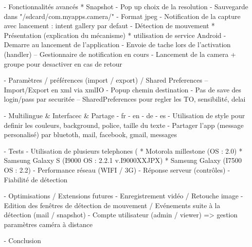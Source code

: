   - Fonctionnalités avancés
    * Snapshot
      - Pop up choix de la resolution
      - Sauvegarde dans "/sdcard/com.myapps.camera/"
      - Format jpeg
      - Notification de la capture avec lancement : intent gallery par defaut
  - Détection de mouvement
    * Présentation (explication du mécanisme) 
    * utilisation de service Android
      - Demarre au lancement de l'application
      - Envoie de tache lors de l'activation (handler)
      -- Gestionnaire de notification en cours
       - Lancement de la camera + groupe pour desactiver en cas de retour
       
  - Paramètres / préférences (import / export) / Shared Preferences
    -- Import/Export en xml via xmlIO
     - Popup chemin destination
     - Pas de save des login/pass par securitée
    -- SharedPreferences pour regler les TO, sensibilité, delai

  - Multilingue & Interfacec & Partage
    - fr - en - de - es
    - Utilisation de style pour definir les couleurs, background, police, taille
      du texte
    - Partager l'app (message personalisé) par bluetoth, mail, facebook, gmail,
      messages
      

- Tests
  - Utilisation de plusieurs telephones (
    * Motorola millestone (OS : 2.0)
    * Samsung Galaxy S (I9000 OS : 2.2.1 v.I9000XXJPX) 
    * Samsung Galaxy (I7500 OS : 2.2)
  - Performance  réseau (WIFI / 3G) - Réponse serveur (contrôles)
  - Fiabilité de détection

- Optimisations / Extensions futures
  - Enregistrement vidéo / Retouche image
  - Edition des fenêtres de détection  de mouvement / Evénements suite à
    la détection (mail / snapshot)
  - Compte utilisateur (admin / viewer) => gestion paramètres caméra à distance

- Conclusion